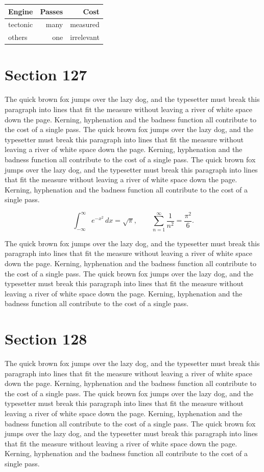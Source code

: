 \documentclass{article}
\begin{document}
\begin{center}
\begin{tabular}{lrr}
\toprule
Engine & Passes & Cost \\
\midrule
tectonic & many & measured \\
others & one & irrelevant \\
\bottomrule
\end{tabular}
\end{center}

\section{Section 127}
The quick brown fox jumps over the lazy dog, and the typesetter must break this paragraph into lines that fit the measure without leaving a river of white space down the page. Kerning, hyphenation and the badness function all contribute to the cost of a single pass. The quick brown fox jumps over the lazy dog, and the typesetter must break this paragraph into lines that fit the measure without leaving a river of white space down the page. Kerning, hyphenation and the badness function all contribute to the cost of a single pass. The quick brown fox jumps over the lazy dog, and the typesetter must break this paragraph into lines that fit the measure without leaving a river of white space down the page. Kerning, hyphenation and the badness function all contribute to the cost of a single pass. 

\begin{equation}
\int_{-\infty}^{\infty} e^{-x^{2}}\,dx = \sqrt{\pi}, \qquad
\sum_{n=1}^{\infty} \frac{1}{n^{2}} = \frac{\pi^{2}}{6}.
\end{equation}

The quick brown fox jumps over the lazy dog, and the typesetter must break this paragraph into lines that fit the measure without leaving a river of white space down the page. Kerning, hyphenation and the badness function all contribute to the cost of a single pass. The quick brown fox jumps over the lazy dog, and the typesetter must break this paragraph into lines that fit the measure without leaving a river of white space down the page. Kerning, hyphenation and the badness function all contribute to the cost of a single pass. 
\section{Section 128}
The quick brown fox jumps over the lazy dog, and the typesetter must break this paragraph into lines that fit the measure without leaving a river of white space down the page. Kerning, hyphenation and the badness function all contribute to the cost of a single pass. The quick brown fox jumps over the lazy dog, and the typesetter must break this paragraph into lines that fit the measure without leaving a river of white space down the page. Kerning, hyphenation and the badness function all contribute to the cost of a single pass. The quick brown fox jumps over the lazy dog, and the typesetter must break this paragraph into lines that fit the measure without leaving a river of white space down the page. Kerning, hyphenation and the badness function all contribute to the cost of a single pass. 
\end{document}
